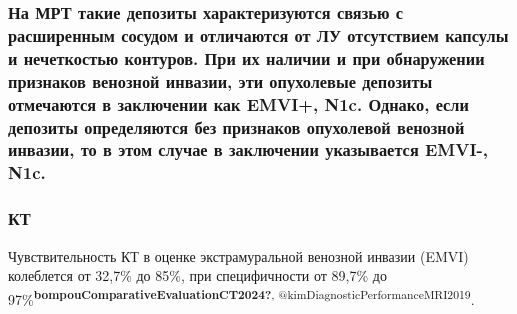 \documentclass[
  russian,
  12pt,
  a4paper,
]{report}
\begin{document}
\subsubsection{На МРТ такие депозиты характеризуются связью с
расширенным сосудом и отличаются от ЛУ отсутствием капсулы и нечеткостью
контуров. При их наличии и при обнаружении признаков венозной инвазии,
эти опухолевые депозиты отмечаются в заключении как EMVI+, N1c. Однако,
если депозиты определяются без признаков опухолевой венозной инвазии, то
в этом случае в заключении указывается EMVI-,
N1c.}\label{ux43dux430-ux43cux440ux442-ux442ux430ux43aux438ux435-ux434ux435ux43fux43eux437ux438ux442ux44b-ux445ux430ux440ux430ux43aux442ux435ux440ux438ux437ux443ux44eux442ux441ux44f-ux441ux432ux44fux437ux44cux44e-ux441-ux440ux430ux441ux448ux438ux440ux435ux43dux43dux44bux43c-ux441ux43eux441ux443ux434ux43eux43c-ux438-ux43eux442ux43bux438ux447ux430ux44eux442ux441ux44f-ux43eux442-ux43bux443-ux43eux442ux441ux443ux442ux441ux442ux432ux438ux435ux43c-ux43aux430ux43fux441ux443ux43bux44b-ux438-ux43dux435ux447ux435ux442ux43aux43eux441ux442ux44cux44e-ux43aux43eux43dux442ux443ux440ux43eux432.-ux43fux440ux438-ux438ux445-ux43dux430ux43bux438ux447ux438ux438-ux438-ux43fux440ux438-ux43eux431ux43dux430ux440ux443ux436ux435ux43dux438ux438-ux43fux440ux438ux437ux43dux430ux43aux43eux432-ux432ux435ux43dux43eux437ux43dux43eux439-ux438ux43dux432ux430ux437ux438ux438-ux44dux442ux438-ux43eux43fux443ux445ux43eux43bux435ux432ux44bux435-ux434ux435ux43fux43eux437ux438ux442ux44b-ux43eux442ux43cux435ux447ux430ux44eux442ux441ux44f-ux432-ux437ux430ux43aux43bux44eux447ux435ux43dux438ux438-ux43aux430ux43a-emvi-n1c.-ux43eux434ux43dux430ux43aux43e-ux435ux441ux43bux438-ux434ux435ux43fux43eux437ux438ux442ux44b-ux43eux43fux440ux435ux434ux435ux43bux44fux44eux442ux441ux44f-ux431ux435ux437-ux43fux440ux438ux437ux43dux430ux43aux43eux432-ux43eux43fux443ux445ux43eux43bux435ux432ux43eux439-ux432ux435ux43dux43eux437ux43dux43eux439-ux438ux43dux432ux430ux437ux438ux438-ux442ux43e-ux432-ux44dux442ux43eux43c-ux441ux43bux443ux447ux430ux435-ux432-ux437ux430ux43aux43bux44eux447ux435ux43dux438ux438-ux443ux43aux430ux437ux44bux432ux430ux435ux442ux441ux44f-emvi--n1c.}

\subsubsection{КТ}\label{ux43aux442-4}

Чувствительность КТ в оценке экстрамуральной венозной инвазии (EMVI)
колеблется от 32,7\% до 85\%, при специфичности от 89,7\% до
97\%\textsuperscript{\textbf{bompouComparativeEvaluationCT2024?},
@kimDiagnosticPerformanceMRI2019}.
\end{document}

